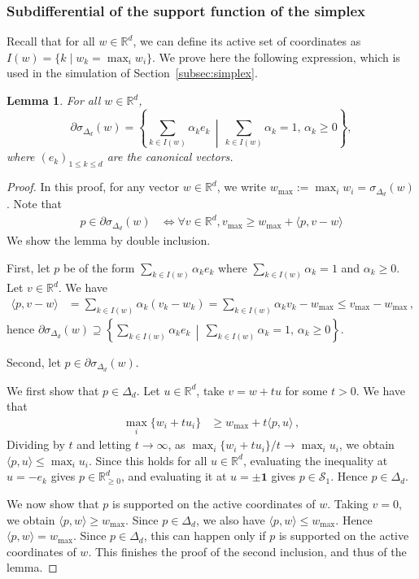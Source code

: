 \documentclass[11pt,english,reqno]{article}
\newcommand{\R}{\mathbb{R}}
\renewcommand{\leq}{\leqslant}
\renewcommand{\geq}{\geqslant}
\theoremstyle{plain}
\newtheorem{lem}[proposition]{Lemma}
\theoremstyle{definition}
\theoremstyle{remark}
\numberwithin{equation}{section}
\begin{document}
\subsubsection{Subdifferential of the support function of the simplex}

Recall that for all $w \in \R^d$, we can define its active set of coordinates as $I(w) = \{k \mid w_k = \max_i w_i\}$. We prove here the following expression, which is used in the simulation of Section~\ref{subsec:simplex}.

\begin{lem}
	\label{lem:proof-support-function-simplex}
	For all $w \in \R^d$, 
	\begin{equation*}
		\partial \sigma_{\Delta_d}(w) = \left\{ \sum_{k \in I(w)} \alpha_k e_k \,\middle|\, \sum_{k \in I(w)} \alpha_k = 1,\, \alpha_k \geq 0 \right\} ,
	\end{equation*}
	where $(e_k)_{1 \leq k \leq d}$ are the canonical vectors.
\end{lem}
%
\begin{proof}
	In this proof, for any vector $w \in \R^d$, we write $w_{\max} := \max_i w_i = \sigma_{\Delta_d}(w)$. Note that
	\begin{align*}
		p \in \partial \sigma_{\Delta_d}(w) &\iff \forall v \in \R^d, v_{\max} \geq w_{\max} + \langle p, v - w\rangle
	\end{align*}
	We show the lemma by double inclusion.

	First, let $p$ be of the form $\sum_{k \in I(w)} \alpha_k e_k$ where $\sum_{k \in I(w)} \alpha_k = 1$ and $\alpha_k \geq 0$. Let $v \in \R^d$. We have
	\begin{align*}
	\langle p, v - w\rangle &= \sum_{k \in I(w)} \alpha_k (v_k - w_k) = \sum_{k \in I(w)} \alpha_k v_k - w_{\max} \leq v_{\max} - w_{\max}\,,
	\end{align*}
	hence $\partial \sigma_{\Delta_d}(w) \supseteq \left\{ \sum_{k \in I(w)} \alpha_k e_k \,\middle|\, \sum_{k \in I(w)} \alpha_k = 1,\, \alpha_k \geq 0 \right\} $.

	Second, let $p \in \partial \sigma_{\Delta_d}(w)$.
	
	We first show that $p \in \Delta_d$. Let $u \in \R^d$, take $v = w + t u$ for some $t > 0$. We have that 
	\begin{align*}
	\max_{i} \{w_i + t u_i\} &\geq w_{\max} + t\langle p, u\rangle \, ,
	\end{align*}
	Dividing by $t$ and letting $t \to \infty$, as $\max_{i} \{w_i + t u_i\} / t \to \max_i u_i$, we obtain $\langle p, u\rangle \leq \max_i u_i$. Since this holds for all $u \in \R^d$, evaluating the inequality at $u = -e_k$ gives $p \in \R_{\geq 0}^d$, and evaluating it at $u = \pm \mathbf{1}$ gives $p \in \mathcal{S}_1$. Hence $p \in \Delta_d$.

	We now show that $p$ is supported on the active coordinates of $w$. Taking $v = 0$, we obtain $\langle p, w\rangle \geq w_{\max}$. Since $p \in \Delta_d$, we also have $\langle p, w\rangle \leq w_{\max}$. Hence $\langle p, w\rangle = w_{\max}$. Since $p \in \Delta_d$, this can happen only if $p$ is supported on the active coordinates of $w$. This finishes the proof of the second inclusion, and thus of the lemma.
\end{proof}
\end{document}
